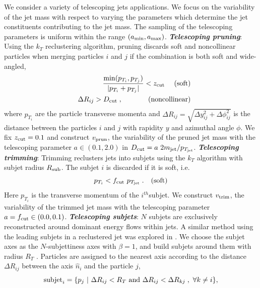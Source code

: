 \documentclass[aps,prl,floatfix,preprintnumbers,twocolumn,groupedaddress,nofootinbib]{revtex4-1}
\newcommand{\be}{\begin{equation}}
\newcommand{\ee}{\end{equation}}
\newcommand{\bea}{\begin{eqnarray}}
\newcommand{\eea}{\end{eqnarray}}
\begin{document}
We consider a variety of telescoping jets applications. We focus on the variability of the jet mass with respect to varying the parameters which determine the jet constituents contributing to the jet mass. The sampling of the telescoping parameters is uniform within the range $(a_{\rm min},a_{\rm max})$.
\newline
\noindent \textit{\textbf{Telescoping pruning}}: Using the $k_T$ reclustering algorithm, pruning discards soft and noncollinear particles when
merging particles $i$ and $j$ if the combination is both soft and wide-angled,
\bea
    &&\frac{{\rm min}(p_{T_i},p_{T_j})}{|p_{T_i}+p_{T_j}|}<z_{\rm cut}~~~~{\rm (soft)}\nonumber\\
    &&\Delta R_{ij} > D_{\rm cut}\;,~~~~~~~~~~~{\rm (noncollinear)}
\eea
where $p_{T_i}$ are the particle transverse momenta and $\Delta R_{ij}=\sqrt{\Delta y_{ij}^2+\Delta \phi_{ij}^2}$ is the distance between the particles $i$ and $j$ with rapidity $y$ and azimuthal angle $\phi$. We fix $z_{\rm cut}=0.1$ and construct $v_{\rm prun}$, the variability of the pruned jet mass with the telescoping parameter $a\in (0.1, 2.0)$ in $D_{\rm cut} = a~ 2m_{\rm jet}/p_{T_{\rm jet}}$. %
\newline
\noindent \textit{\textbf{Telescoping trimming}}: Trimming \cite{Krohn:2009th} reclusters jets into subjets using the $k_T$ algorithm with subjet radius $R_{\rm sub}$. The subjet $i$ is discarded if it is soft, i.e.
\be
    p_{T_i} < f_{\rm cut}~p_{T_{\rm jet}}\;.~~~{\rm (soft)}
\ee
Here $p_{T_i}$ is the transverse momentum of the $i^{th}$subjet. We construct $v_{\rm trim}$, the variability of the trimmed jet mass with the telescoping parameter $a = f_{\rm cut} \in (0.0, 0.1)$. %
\newline
\noindent \textit{\textbf{Telescoping subjets}}: $N$ subjets are exclusively reconstructed around dominant energy flows within jets. A similar method using the leading subjets in a reclustered jet was explored in \cite{Cui:2010km}. We choose the subjet axes as the $N$-subjettiness axes \cite{Thaler:2010tr} with $\beta = 1$, and build subjets around them with radius $R_T$ \cite{Stewart:2010tn,Chien:2013kca,Stewart:2015waa,Thaler:2015xaa}. Particles are assigned to the nearest axis according to the distance $\Delta R_{ij}$ between the axis $\hat n_i$ and the particle $j$,
\begin{equation}
    {\rm subjet}_{i} = \{p_j~|~\Delta R_{ij}<R_T~{\rm and}~\Delta R_{ij}<\Delta R_{kj}\;,~\forall k\neq i\},
\end{equation}
\end{document}
